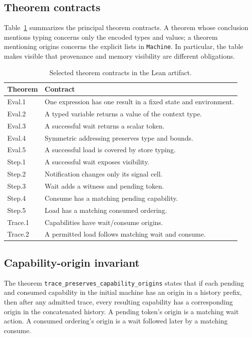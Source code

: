 \documentclass[a4paper,USenglish]{lipics-v2021}
\begin{document}
\subsection{Theorem contracts}
Table~\ref{tab:theorems} summarizes the principal theorem contracts. A theorem
whose conclusion mentions typing concerns only the encoded types and values;
a theorem mentioning origins concerns the explicit lists in \texttt{Machine}.
In particular, the table makes visible that provenance and memory visibility
are different obligations.
\begin{table}[t]
\centering
\caption{Selected theorem contracts in the Lean artifact.}
\label{tab:theorems}
\scriptsize
\setlength{\tabcolsep}{2pt}
\begin{tabular}{>{\raggedright\arraybackslash}p{.40\linewidth}
                >{\raggedright\arraybackslash}p{.51\linewidth}}
\hline
Theorem & Contract \\
\hline
Eval.1 & One expression has one result in a fixed state and environment.\\
Eval.2 & A typed variable returns a value of the context type.\\
Eval.3 & A successful wait returns a scalar token.\\
Eval.4 & Symmetric addressing preserves type and bounds.\\
Eval.5 & A successful load is covered by store typing.\\
Step.1 & A successful wait exposes visibility.\\
Step.2 & Notification changes only its signal cell.\\
Step.3 & Wait adds a witness and pending token.\\
Step.4 & Consume has a matching pending capability.\\
Step.5 & Load has a matching consumed ordering.\\
Trace.1 & Capabilities have wait/consume origins.\\
Trace.2 & A permitted load follows matching wait and consume.\\
\hline
\end{tabular}
\end{table}

\subsection{Capability-origin invariant}
The theorem \texttt{trace\_preserves\_capability\_origins} states that if each pending and consumed capability in the initial machine has an origin in a history prefix, then after any admitted trace, every resulting capability has a corresponding origin in the concatenated history. A pending token's origin is a matching wait action. A consumed ordering's origin is a wait followed later by a matching consume.
\end{document}
